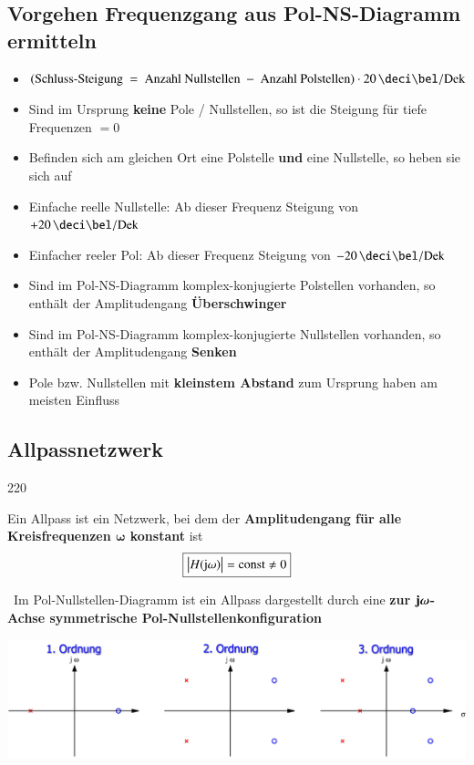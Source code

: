 \subsection{Vorgehen Frequenzgang aus Pol-NS-Diagramm ermitteln}

\begin{itemize}
    \item $(\text{Schluss-Steigung } = \text{ Anzahl Nullstellen } - \text{ Anzahl Polstellen}) \cdot 20 \, \deci \bel / \Dek$
    \item Sind im Ursprung \textbf{keine} Pole / Nullstellen, so ist die Steigung für tiefe Frequenzen $= 0$
    \item Befinden sich am gleichen Ort eine Polstelle \textbf{und} eine Nullstelle, so heben sie sich auf
    \item Einfache reelle Nullstelle: Ab dieser Frequenz Steigung von  $+20 \, \deci \bel / \Dek$
    \item Einfacher reeler Pol: Ab dieser Frequenz Steigung von  $-20 \, \deci \bel / \Dek$
    \item Sind im Pol-NS-Diagramm komplex-konjugierte Polstellen vorhanden, so enthält der Amplitudengang \textbf{Überschwinger}
    \item Sind im Pol-NS-Diagramm komplex-konjugierte Nullstellen vorhanden, so enthält der Amplitudengang \textbf{Senken}
    \item Pole bzw. Nullstellen mit \textbf{kleinstem Abstand} zum Ursprung haben am meisten Einfluss
\end{itemize}


\subsection{Allpassnetzwerk}{220}

Ein Allpass ist ein Netzwerk, bei dem der \textbf{Amplitudengang für alle Kreisfrequenzen $\bm{\omega}$ konstant} ist
$$ \boxed{\left|H(\mathrm{j} \omega)\right| = \mathrm{const} \neq 0}$$

\textrightarrow\ Im Pol-Nullstellen-Diagramm ist ein Allpass dargestellt durch eine 
\textbf{zur $\bm{\mathrm{j} \omega}$-Achse symmetrische Pol-Nullstellenkonfiguration}

\includegraphics[width=\columnwidth]{images/allpass.png}

